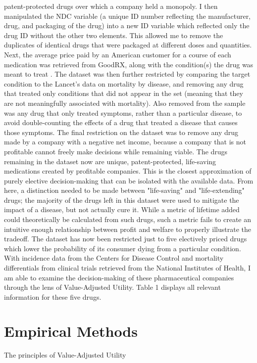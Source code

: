 \documentclass[12pt,english]{article} \usepackage{mathptmx}
\begin{document}
patent-protected drugs over which a company held a monopoly. I then 
manipulated the NDC variable (a unique ID number reflecting the 
manufacturer, drug, and packaging of the drug) into a new ID variable 
which reflected only the drug ID without the other two elements. This 
allowed me to remove the duplicates of identical drugs that were 
packaged at different doses and quantities. Next, the average price paid 
by an American customer for a course of each medication was retrieved 
from GoodRX, along with the condition(s) the drug was meant to treat 
\cite{goodrx}. The dataset was then further restricted by comparing the 
target condition to the Lancet's data on mortality by disease, and 
removing any drug that treated only conditions that did not appear in 
the set (meaning that they are not meaningfully associated with 
mortality)\cite{cod18}. Also removed from the sample was any drug that 
only treated symptoms, rather than a particular disease, to avoid 
double-counting the effects of a drug that treated a disease that causes 
those symptoms. The final restriction on the dataset was to remove any 
drug made by a company with a negative net income, because a company 
that is not profitable cannot freely make decisions while remaining 
viable. The drugs remaining in the dataset now are unique, 
patent-protected, life-saving medications created by profitable 
companies. This is the closest approximation of purely elective 
decision-making that can be isolated with the available data. From here, 
a distinction needed to be made between "life-saving" and 
"life-extending" drugs; the majority of the drugs left in this dataset 
were used to mitigate the impact of a disease, but not actually cure it. 
While a metric of lifetime added could theoretically be calculated from 
such drugs, such a metric fails to create an intuitive enough 
relationship between profit and welfare to properly illustrate the 
tradeoff. The dataset has now been restricted just to five electively 
priced drugs which lower the probability of its consumer dying from a 
particular condition. With incidence data from the Centers for Disease 
Control and mortality differentials from clinical trials retrieved from 
the National Institutes of Health, I am able to examine the 
decision-making of these pharmaceutical companies through the lens of 
Value-Adjusted Utility\cite{cdc20}\cite{trials}. Table 1 displays all 
relevant information for these five drugs. \section{Empirical 
Methods}\label{sec:methods} The principles of Value-Adjusted Utility 
\end{document}
